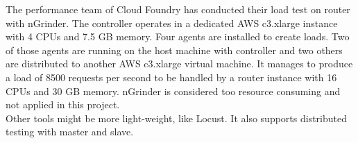 The performance team of Cloud Foundry has conducted their load test on router with nGrinder. The controller operates in a dedicated AWS c3.xlarge instance with 4 CPUs and 7.5 GB memory. Four agents are installed to create loads. Two of those agents are running on the host machine with controller and two others are distributed to another AWS c3.xlarge virtual machine. It manages to produce a load of 8500 requests per second to be handled by a router instance with 16 CPUs and 30 GB memory. nGrinder is considered too resource consuming and not applied in this project. \\
Other tools might be more light-weight, like Locust. It also supports distributed testing with master and slave. 





  
